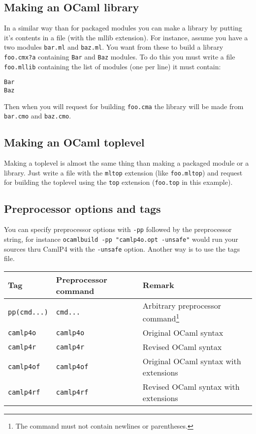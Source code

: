 \documentclass[9pt]{article}
\begin{document}
\subsection{Making an OCaml library}
In  a  similar  way than for packaged modules you can make a library by putting
it's  contents  in  a file (with the mllib extension). For instance, assume you
have  a two modules \texttt{bar.ml} and \texttt{baz.ml}. You want from these to
build  a  library  \texttt{foo.cmx?a}  containing \texttt{Bar} and \texttt{Baz}
modules.  To  do  this  you must write a file \texttt{foo.mllib} containing the
list of modules (one per line) it must contain:
\begin{verbatim}
Bar
Baz
\end{verbatim}
Then  when  you  will request for building \texttt{foo.cma} the library will be
made from \texttt{bar.cmo} and \texttt{baz.cmo}.
\subsection{Making an OCaml toplevel}
Making  a  toplevel is almost the same thing than making a packaged module or a
library.   Just   write   a   file  with  the  \texttt{mltop}  extension  (like
\texttt{foo.mltop})   and   request   for   building  the  toplevel  using  the
\texttt{top} extension (\texttt{foo.top} in this example).
\subsection{Preprocessor options and tags}
You can specify preprocessor options with \texttt{-pp} followed by the
preprocessor string, for instance \texttt{ocamlbuild -pp "camlp4o.opt -unsafe"}
would run your sources thru CamlP4 with the \texttt{-unsafe} option.
Another way is to use the tags file.  
\begin{center}
  \begin{tabular}{|l|l|l|}
    \hline
    \textbf{Tag}        & \textbf{Preprocessor command} & \textbf{Remark} \\
    \hline
    \hline
    \texttt{pp(cmd...)} & \texttt{cmd...}               & Arbitrary
        preprocessor command\footnote{The command must not contain newlines or parentheses.} \\
    \hline
    \texttt{camlp4o}    & \texttt{camlp4o}              & Original OCaml syntax \\
    \hline
    \texttt{camlp4r}    & \texttt{camlp4r}              & Revised OCaml syntax \\
    \hline
    \texttt{camlp4of}   & \texttt{camlp4of}             & Original OCaml syntax with extensions \\
    \hline
    \texttt{camlp4rf}   & \texttt{camlp4rf}             & Revised OCaml syntax with extensions \\
    \hline
  \end{tabular}
\end{center}
\end{document}
